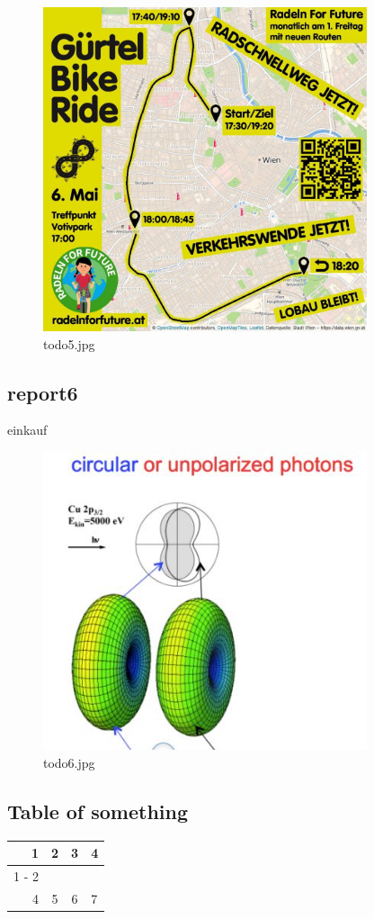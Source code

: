 \documentclass{article}%
\begin{document}
\begin{figure}[htb!]%
\centering%
\includegraphics[width=360px]{todo5.jpg}%
\caption{todo5.jpg}%
\end{figure}

%
\FloatBarrier

%
\subsection{report6}%
\label{subsec:report6}%
einkauf%


\begin{figure}[htb!]%
\centering%
\includegraphics[width=360px]{todo6.jpg}%
\caption{todo6.jpg}%
\end{figure}

%
\FloatBarrier

%
\subsection{Table of something}%
\label{subsec:Tableofsomething}%
\begin{tabular}{rc|cl}%
\hline%
1&2&3&4\\%
\cline{1%
-%
2}%
&&&\\%
4&5&6&7\\%
\end{tabular}
\end{document}
